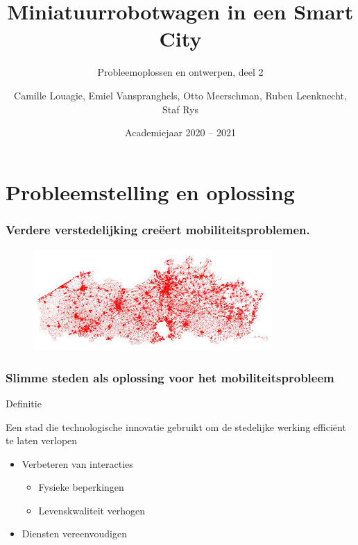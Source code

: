 \documentclass[aspectratio=169,kulak,t,handout]{kulakbeamer} %
\title[Groep 1 - Safety First]{Miniatuurrobotwagen in een Smart City}
\subtitle{Probleemoplossen en ontwerpen, deel 2}
\author{Camille Louagie, Emiel Vanspranghels, Otto Meerschman, Ruben Leenknecht, Staf Rys}
\institute[Kulak]{KU Leuven Kulak}
\date{Academiejaar 2020 -- 2021}
\begin{document}
\begin{titleframe}
\titlepage
\end{titleframe}


\section*{Probleemstelling en oplossing}

\begin{frame}
	\frametitle{{\Large Verdere verstedelijking creëert mobiliteitsproblemen.}}


	\begin{figure}
		\centering
		\includegraphics[width=.6\textwidth]{ruimtelijkestaat}
		
		\label{fig:ruimtelijkestaat}
	\end{figure}
\end{frame}

\begin{frame}
	\frametitle{{\large Slimme steden als oplossing voor het mobiliteitsprobleem}}
	
\begin{block}{Definitie}
	
	Een stad die technologische innovatie gebruikt om de stedelijke werking efficiënt te laten verlopen
	
\end{block}	
	\begin{itemize}
		\large\item  Verbeteren van interacties
		\begin{itemize}
			\normalsize\item Fysieke beperkingen
			\item Levenskwaliteit verhogen
		\end{itemize}
		\item  Diensten vereenvoudigen
	\end{itemize}
\end{frame}
\end{document}
